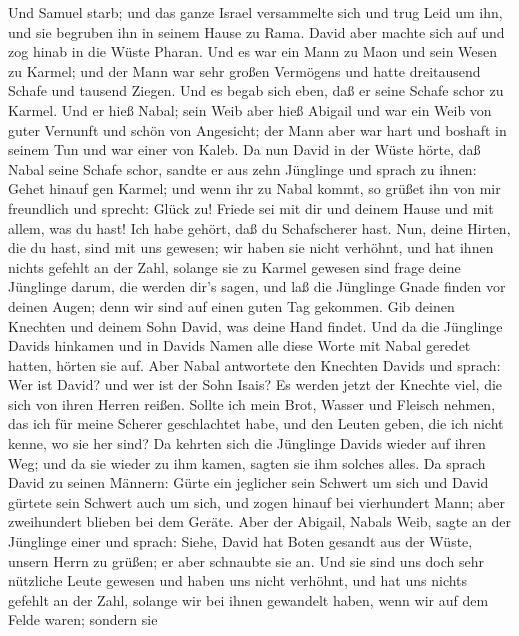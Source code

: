  Und Samuel starb; und das ganze Israel versammelte sich und
trug Leid um ihn, und sie begruben ihn in seinem Hause zu Rama. David
aber machte sich auf und zog hinab in die Wüste Pharan.  Und
es war ein Mann zu Maon und sein Wesen zu Karmel; und der Mann war sehr
großen Vermögens und hatte dreitausend Schafe und tausend Ziegen. Und es
begab sich eben, daß er seine Schafe schor zu Karmel.  Und
er hieß Nabal; sein Weib aber hieß Abigail und war ein Weib von guter
Vernunft und schön von Angesicht; der Mann aber war hart und boshaft in
seinem Tun und war einer von Kaleb.  Da nun David in der
Wüste hörte, daß Nabal seine Schafe schor,  sandte er aus
zehn Jünglinge und sprach zu ihnen: Gehet hinauf gen Karmel; und wenn
ihr zu Nabal kommt, so grüßet ihn von mir freundlich  und
sprecht: Glück zu! Friede sei mit dir und deinem Hause und mit allem,
was du hast!  Ich habe gehört, daß du Schafscherer hast.
Nun, deine Hirten, die du hast, sind mit uns gewesen; wir haben sie
nicht verhöhnt, und hat ihnen nichts gefehlt an der Zahl, solange sie zu
Karmel gewesen sind  frage deine Jünglinge darum, die werden
dir's sagen, und laß die Jünglinge Gnade finden vor deinen Augen; denn
wir sind auf einen guten Tag gekommen. Gib deinen Knechten und deinem
Sohn David, was deine Hand findet.  Und da die Jünglinge
Davids hinkamen und in Davids Namen alle diese Worte mit Nabal geredet
hatten, hörten sie auf.  Aber Nabal antwortete den Knechten
Davids und sprach: Wer ist David? und wer ist der Sohn Isais? Es werden
jetzt der Knechte viel, die sich von ihren Herren reißen. 
Sollte ich mein Brot, Wasser und Fleisch nehmen, das ich für meine
Scherer geschlachtet habe, und den Leuten geben, die ich nicht kenne, wo
sie her sind?  Da kehrten sich die Jünglinge Davids wieder
auf ihren Weg; und da sie wieder zu ihm kamen, sagten sie ihm solches
alles.  Da sprach David zu seinen Männern: Gürte ein
jeglicher sein Schwert um sich und David gürtete sein Schwert auch um
sich, und zogen hinauf bei vierhundert Mann; aber zweihundert blieben
bei dem Geräte.  Aber der Abigail, Nabals Weib, sagte an
der Jünglinge einer und sprach: Siehe, David hat Boten gesandt aus der
Wüste, unsern Herrn zu grüßen; er aber schnaubte sie an. 
Und sie sind uns doch sehr nützliche Leute gewesen und haben uns nicht
verhöhnt, und hat uns nichts gefehlt an der Zahl, solange wir bei ihnen
gewandelt haben, wenn wir auf dem Felde waren;  sondern sie
